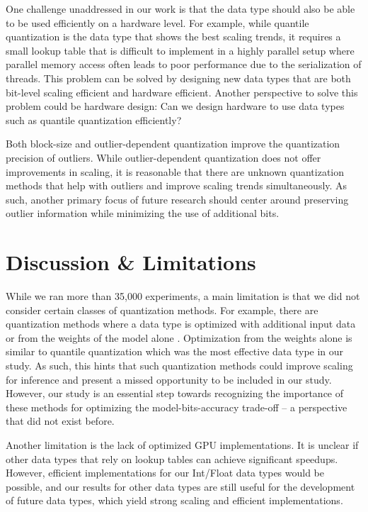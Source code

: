 One challenge unaddressed in our work is that the data type should also be able to be used efficiently on a hardware level. For example, while quantile quantization is the data type that shows the best scaling trends, it requires a small lookup table that is difficult to implement in a highly parallel setup where parallel memory access often leads to poor performance due to the serialization of threads. This problem can be solved by designing new data types that are both bit-level scaling efficient and hardware efficient. Another perspective to solve this problem could be hardware design: Can we design hardware to use data types such as quantile quantization efficiently?

Both block-size and outlier-dependent quantization improve the quantization precision of outliers. While outlier-dependent quantization does not offer improvements in scaling, it is reasonable that there are unknown quantization methods that help with outliers and improve scaling trends simultaneously. As such, another primary focus of future research should center around preserving outlier information while minimizing the use of additional bits.

\section{Discussion \& Limitations}

While we ran more than 35,000 experiments, a main limitation is that we did not consider certain classes of quantization methods. For example, there are quantization methods where a data type is optimized with additional input data \citep{Rastegari2016xnor,frantar2022gptq} or from the weights of the model alone \citep{gong2014compressing}. Optimization from the weights alone is similar to quantile quantization which was the most effective data type in our study. As such, this hints that such quantization methods could improve scaling for inference and present a missed opportunity to be included in our study. However, our study is an essential step towards recognizing the importance of these methods for optimizing the model-bits-accuracy trade-off -- a perspective that did not exist before.

Another limitation is the lack of optimized GPU implementations. It is unclear if other data types that rely on lookup tables can achieve significant speedups. However, efficient implementations for our Int/Float data types would be possible, and our results for other data types are still useful for the development of future data types, which yield strong scaling and efficient implementations.

